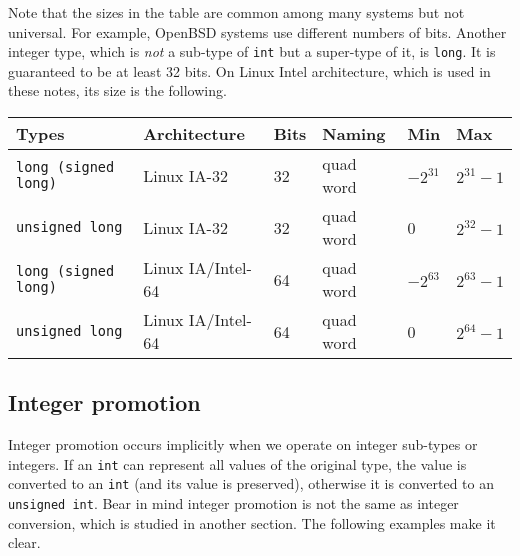 Note that the sizes in the table are common among many systems but not universal. For example, OpenBSD systems use different numbers of bits. Another integer type, which is \textit{not} a sub-type of \texttt{int} but a super-type of it, is \texttt{long}. It is guaranteed to be at least 32 bits. On Linux Intel architecture, which is used in these notes, its size is the following.

\begin{tabular}{p{}p{}p{}p{}p{}p{}} \toprule 
	{Types} & {Architecture} & {Bits} & {Naming} & {Min} &{Max} \\ \midrule
	\texttt{long (signed long)} & Linux IA-32 & 32 & quad word  & $-2^{31}$ & $2^{31}-1$\\
	\texttt{unsigned long} & Linux IA-32 & 32 & quad word & 0 & $2^{32}-1$\\
	\texttt{long (signed long)} & Linux IA/Intel-64 & 64 & quad word & $-2^{63}$ & $2^{63}-1$\\
	\texttt{unsigned long} & Linux IA/Intel-64 & 64 & quad word &0 & $2^{64}-1$\\
    \bottomrule
\end{tabular}




\subsection{Integer promotion}

Integer promotion occurs implicitly when we operate on integer sub-types or integers. If an \texttt{int} can represent all values of the original type, the value is converted to an \texttt{int} (and its value is preserved), otherwise it is converted to an \texttt{unsigned int}. Bear in mind integer promotion is not the same as integer conversion, which is studied in another section. The following examples make it clear.

